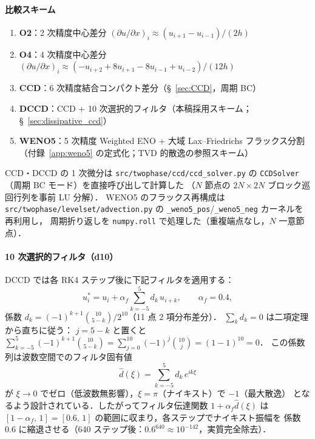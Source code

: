 \paragraph{比較スキーム}
\begin{enumerate}
  \item \textbf{O2}：2 次精度中心差分
        $(\partial u / \partial x)_i \approx (u_{i+1} - u_{i-1}) / (2h)$
  \item \textbf{O4}：4 次精度中心差分
        $(\partial u / \partial x)_i \approx (-u_{i+2} + 8u_{i+1} - 8u_{i-1} + u_{i-2}) / (12h)$
  \item \textbf{CCD}：6 次精度結合コンパクト差分（§~\ref{sec:CCD}，周期 BC）
  \item \textbf{DCCD}：CCD + 10 次選択的フィルタ（本稿採用スキーム；§~\ref{sec:dissipative_ccd}）
  \item \textbf{WENO5}：5 次精度 Weighted ENO + 大域 Lax--Friedrichs フラックス分割
        （付録~\ref{app:weno5} の定式化；TVD 的散逸の参照スキーム）
\end{enumerate}

CCD・DCCD の 1 次微分は \texttt{src/twophase/ccd/ccd\_solver.py} の
\texttt{CCDSolver}（周期 BC モード）を直接呼び出して計算した
（$N$ 節点の $2N \times 2N$ ブロック巡回行列を事前 LU 分解）．
WENO5 のフラックス再構成は \texttt{src/twophase/levelset/advection.py} の
\texttt{\_weno5\_pos}/\texttt{\_weno5\_neg} カーネルを再利用し，
周期折り返しを \texttt{numpy.roll} で処理した（重複端点なし，$N$ 一意節点）．

\paragraph{10 次選択的フィルタ（d10）}
DCCD では各 RK4 ステップ後に下記フィルタを適用する：
\begin{equation}
  u_i^* = u_i + \alpha_f \sum_{k=-5}^{5} d_k\, u_{i+k},
  \qquad \alpha_f = 0.4,
  \label{eq:d10_filter}
\end{equation}
係数 $d_k = (-1)^{k+1} \binom{10}{5-k} / 2^{10}$（11 点 2 項分布差分）．
$\sum_k d_k = 0$ は二項定理から直ちに従う：
$j = 5-k$ と置くと
$\sum_{k=-5}^{5} (-1)^{k+1}\binom{10}{5-k}
= \sum_{j=0}^{10}(-1)^{j}\binom{10}{j} = (1-1)^{10} = 0$．
この係数列は波数空間でのフィルタ固有値
\begin{equation}
  \hat{d}(\xi) = \sum_{k=-5}^{5} d_k\, e^{ik\xi}
  \label{eq:d10_eigenvalue}
\end{equation}
が $\xi \to 0$ でゼロ（低波数無影響），$\xi = \pi$（ナイキスト）で $-1$（最大散逸）
となるよう設計されている．したがってフィルタ伝達関数 $1 + \alpha_f \hat{d}(\xi)$ は
$[1-\alpha_f,\, 1] = [0.6,\, 1]$ の範囲に収まり，各ステップでナイキスト振幅を
係数 $0.6$ に縮退させる（640 ステップ後：$0.6^{640} \approx 10^{-142}$，実質完全除去）．

